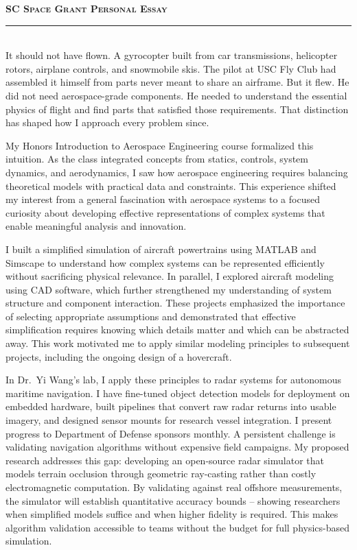 \documentclass[12pt]{article}
\begin{document}
{\color{garnet}\large\textbf{\textsc{SC Space Grant Personal Essay}}}\\[-0.8em]
{\color{garnet}\rule{\textwidth}{0.5pt}}\\[0.2em]
It should not have flown. A gyrocopter built from car transmissions, helicopter rotors, airplane controls, and snowmobile skis. The pilot at USC Fly Club had assembled it himself from parts never meant to share an airframe. But it flew. He did not need aerospace-grade components. He needed to understand the essential physics of flight and find parts that satisfied those requirements. That distinction has shaped how I approach every problem since.

My Honors Introduction to Aerospace Engineering course formalized this intuition. As the class integrated concepts from statics, controls, system dynamics, and aerodynamics, I saw how aerospace engineering requires balancing theoretical models with practical data and constraints. This experience shifted my interest from a general fascination with aerospace systems to a focused curiosity about developing effective representations of complex systems that enable meaningful analysis and innovation.

I built a simplified simulation of aircraft powertrains using MATLAB and Simscape to understand how complex systems can be represented efficiently without sacrificing physical relevance. In parallel, I explored aircraft modeling using CAD software, which further strengthened my understanding of system structure and component interaction. These projects emphasized the importance of selecting appropriate assumptions and demonstrated that effective simplification requires knowing which details matter and which can be abstracted away. This work motivated me to apply similar modeling principles to subsequent projects, including the ongoing design of a hovercraft.

In Dr.\ Yi Wang's lab, I apply these principles to radar systems for autonomous maritime navigation. I have fine-tuned object detection models for deployment on embedded hardware, built pipelines that convert raw radar returns into usable imagery, and designed sensor mounts for research vessel integration. I present progress to Department of Defense sponsors monthly. A persistent challenge is validating navigation algorithms without expensive field campaigns. My proposed research addresses this gap: developing an open-source radar simulator that models terrain occlusion through geometric ray-casting rather than costly electromagnetic computation. By validating against real offshore measurements, the simulator will establish quantitative accuracy bounds -- showing researchers when simplified models suffice and when higher fidelity is required. This makes algorithm validation accessible to teams without the budget for full physics-based simulation.
\end{document}
